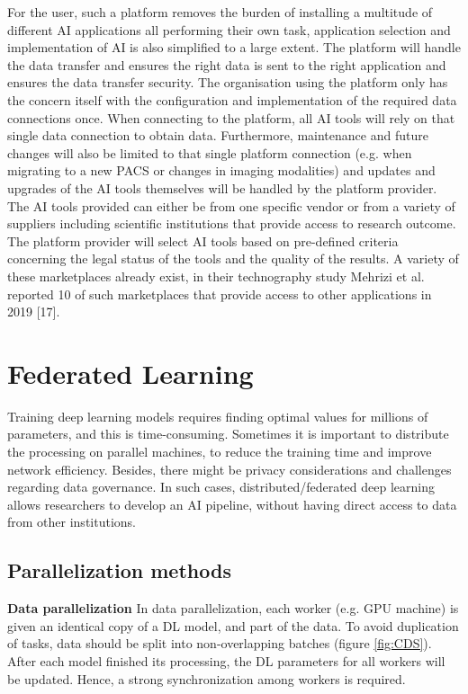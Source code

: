 For the user, such a platform removes the burden of installing a multitude of different AI applications all performing their own task, application selection and implementation of AI is also simplified to a large extent. The platform will handle the data transfer and ensures the right data is sent to the right application and ensures the data transfer security. The organisation using the platform only has the concern itself with the configuration and implementation of the required data connections once. When connecting to the platform, all AI tools will rely on that single data connection to obtain data. Furthermore, maintenance and future changes will also be limited to that single platform connection (e.g. when migrating to a new PACS or changes in imaging modalities) and updates and upgrades of the AI tools themselves will be handled by the platform provider. The AI tools provided can either be from one specific vendor or from a variety of suppliers including scientific institutions that provide access to research outcome. The platform provider will select AI tools based on pre-defined criteria concerning the legal status of the tools and the quality of the results. A variety of these marketplaces already exist, in their technography study Mehrizi et al. reported 10 of such marketplaces that provide access to other applications in 2019 [17].



\section{Federated Learning}
Training deep learning models requires finding optimal values for millions of parameters, and this is time-consuming. Sometimes it is important to distribute the processing on parallel machines, to reduce the training time and improve network efficiency. Besides, there might be privacy considerations and challenges regarding data governance. In such cases, distributed/federated deep learning allows researchers to develop an AI pipeline, without having direct access to data from other institutions. 
\subsection{Parallelization methods}
\textbf{Data parallelization} In data parallelization, each worker (e.g. GPU machine) is given an identical copy of a DL model, and part of the data. To avoid duplication of tasks, data should be split into non-overlapping batches (figure \ref{fig:CDS}). After each model finished its processing, the DL parameters for all workers will be updated. Hence, a strong synchronization among workers is required. 



